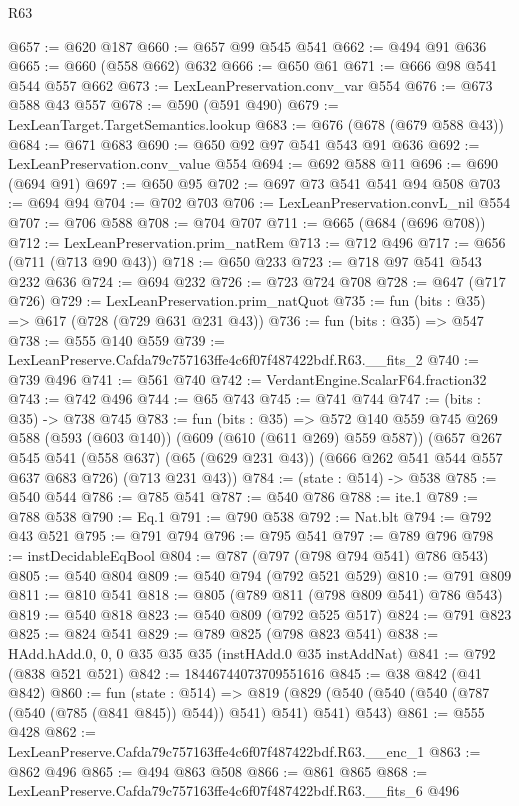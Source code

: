 \begin{lexlean}{R63}
\begin{coremodule}
@657 := @620 @187
@660 := @657 @99 @545 @541
@662 := @494 @91 @636
@665 := @660 (@558 @662) @632
@666 := @650 @61
@671 := @666 @98 @541 @544 @557 @662
@673 := LexLeanPreservation.conv_var @554
@676 := @673 @588 @43 @557
@678 := @590 (@591 @490)
@679 := LexLeanTarget.TargetSemantics.lookup
@683 := @676 (@678 (@679 @588 @43))
@684 := @671 @683
@690 := @650 @92 @97 @541 @543 @91 @636
@692 := LexLeanPreservation.conv_value @554
@694 := @692 @588 @11
@696 := @690 (@694 @91)
@697 := @650 @95
@702 := @697 @73 @541 @541 @94 @508
@703 := @694 @94
@704 := @702 @703
@706 := LexLeanPreservation.convL_nil @554
@707 := @706 @588
@708 := @704 @707
@711 := @665 (@684 (@696 @708))
@712 := LexLeanPreservation.prim_natRem
@713 := @712 @496
@717 := @656 (@711 (@713 @90 @43))
@718 := @650 @233
@723 := @718 @97 @541 @543 @232 @636
@724 := @694 @232
@726 := @723 @724 @708
@728 := @647 (@717 @726)
@729 := LexLeanPreservation.prim_natQuot
@735 := fun (bits : @35) => @617 (@728 (@729 @631 @231 @43))
@736 := fun (bits : @35) => @547
@738 := @555 @140 @559
@739 := LexLeanPreserve.Cafda79c757163ffe4c6f07f487422bdf.R63.__fits_2
@740 := @739 @496
@741 := @561 @740
@742 := VerdantEngine.ScalarF64.fraction32
@743 := @742 @496
@744 := @65 @743
@745 := @741 @744
@747 := (bits : @35) -> @738 @745
@783 := fun (bits : @35) =>
  @572
    @140
    @559
    @745
    @269
    @588
    (@593 (@603 @140))
    (@609 (@610 (@611 @269) @559 @587))
    (@657
      @267
      @545
      @541
      (@558 @637)
      (@65 (@629 @231 @43))
      (@666 @262 @541 @544 @557 @637 @683 @726)
      (@713 @231 @43))
@784 := (state : @514) -> @538
@785 := @540 @544
@786 := @785 @541
@787 := @540 @786
@788 := ite.{1}
@789 := @788 @538
@790 := Eq.{1}
@791 := @790 @538
@792 := Nat.blt
@794 := @792 @43 @521
@795 := @791 @794
@796 := @795 @541
@797 := @789 @796
@798 := instDecidableEqBool
@804 := @787 (@797 (@798 @794 @541) @786 @543)
@805 := @540 @804
@809 := @540 @794 (@792 @521 @529)
@810 := @791 @809
@811 := @810 @541
@818 := @805 (@789 @811 (@798 @809 @541) @786 @543)
@819 := @540 @818
@823 := @540 @809 (@792 @525 @517)
@824 := @791 @823
@825 := @824 @541
@829 := @789 @825 (@798 @823 @541)
@838 := HAdd.hAdd.{0, 0, 0} @35 @35 @35 (instHAdd.{0} @35 instAddNat)
@841 := @792 (@838 @521 @521)
@842 := 18446744073709551616
@845 := @38 @842 (@41 @842)
@860 := fun (state : @514) =>
  @819 (@829 (@540 (@540 (@540 (@787 (@540 (@785 (@841 @845)) @544)) @541) @541) @541) @543)
@861 := @555 @428
@862 := LexLeanPreserve.Cafda79c757163ffe4c6f07f487422bdf.R63.__enc_1
@863 := @862 @496
@865 := @494 @863 @508
@866 := @861 @865
@868 := LexLeanPreserve.Cafda79c757163ffe4c6f07f487422bdf.R63.__fits_6 @496

\end{coremodule}
\end{lexlean}
